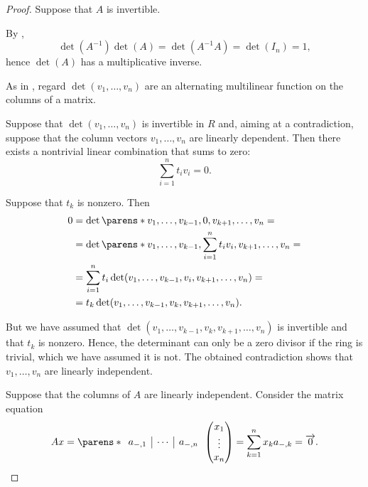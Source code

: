 \begin{proof}
   Suppose that \( A \) is invertible.

  By ,
  \begin{equation*}
    \det(A^{-1}) \det(A) = \det(A^{-1} A) = \det(I_n) = 1,
  \end{equation*}
  hence \( \det(A) \) has a multiplicative inverse.

   As in , regard \( \det(v_1, \ldots, v_n) \) are an alternating multilinear function on the columns of a matrix.

  Suppose that \( \det(v_1, \ldots, v_n) \) is invertible in \( R \) and, aiming at a contradiction, suppose that the column vectors \( v_1, \ldots, v_n \) are linearly dependent. Then there exists a nontrivial linear combination that sums to zero:
  \begin{equation*}
    \sum_{i=1}^n t_i v_i = 0.
  \end{equation*}

  Suppose that \( t_k \) is nonzero. Then
  \begin{align*}
    0
    &=
    \det\parens*{ v_1, \ldots, v_{k-1}, 0, v_{k+1}, \ldots, v_n }
    = \\ &=
    \det\parens*{ v_1, \ldots, v_{k-1}, \sum_{i=1}^n t_i v_i, v_{k+1}, \ldots, v_n }
    = \\ &=
    \sum_{i=1}^n t_i \det( v_1, \ldots, v_{k-1}, v_i, v_{k+1}, \ldots, v_n )
    = \\ &=
    t_k \det( v_1, \ldots, v_{k-1}, v_k, v_{k+1}, \ldots, v_n ).
  \end{align*}

  But we have assumed that \( \det( v_1, \ldots, v_{k-1}, v_k, v_{k+1}, \ldots, v_n ) \) is invertible and that \( t_k \) is nonzero. Hence, the determinant can only be a zero divisor if the ring is trivial, which we have assumed it is not. The obtained contradiction shows that \( v_1, \ldots, v_n \) are linearly independent.

   Suppose that the columns of \( A \) are linearly independent. Consider the matrix equation
  \begin{equation*}
    Ax
    =
    \parens*
    {
      \begin{array}{c|c|c}
        a_{\anon*,1} & \cdots & a_{\anon*,n}
      \end{array}
    }
    \begin{pmatrix}
      x_1 \\ \vdots \\ x_n
    \end{pmatrix}
    =
    \sum_{k=1}^n x_k a_{\anon*,k}
    =
    \vect 0.
  \end{equation*}


\end{proof}
